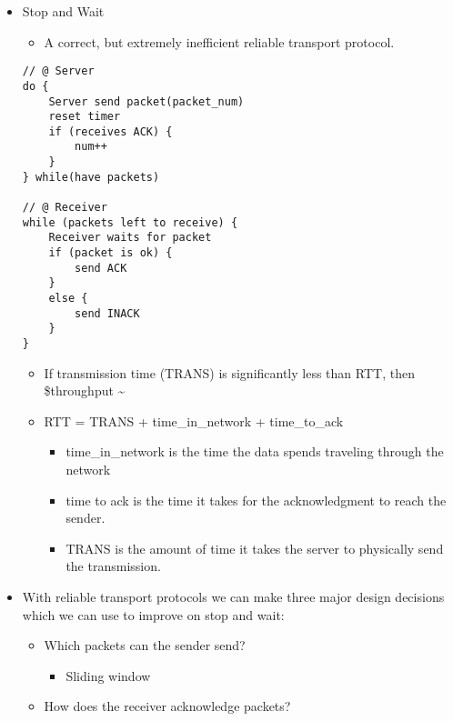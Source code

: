 \begin{itemize}
\tightlist
\item
  Stop and Wait

  \begin{itemize}
  \tightlist
  \item
    A correct, but extremely inefficient reliable transport protocol.
  \end{itemize}

\begin{verbatim}
// @ Server
do {
    Server send packet(packet_num)
    reset timer
    if (receives ACK) {
        num++
    }
} while(have packets)

// @ Receiver 
while (packets left to receive) {
    Receiver waits for packet 
    if (packet is ok) {
        send ACK 
    }
    else {
        send INACK
    }
}
\end{verbatim}

  \begin{itemize}
  \tightlist
  \item
    If transmission time (TRANS) is significantly less than RTT, then
    \$throughput \textasciitilde{} 
  \item
    RTT = TRANS + time\_in\_network + time\_to\_ack

    \begin{itemize}
    \tightlist
    \item
      time\_in\_network is the time the data spends traveling through
      the network
    \item
      time to ack is the time it takes for the acknowledgment to reach
      the sender.
    \item
      TRANS is the amount of time it takes the server to physically send
      the transmission.
    \end{itemize}
  \end{itemize}
\item
  With reliable transport protocols we can make three major design
  decisions which we can use to improve on stop and wait:

  \begin{itemize}
  \tightlist
  \item
    Which packets can the sender send?

    \begin{itemize}
    \tightlist
    \item
      Sliding window
    \end{itemize}
  \item
    How does the receiver acknowledge packets?


\end{itemize}
\end{itemize}
